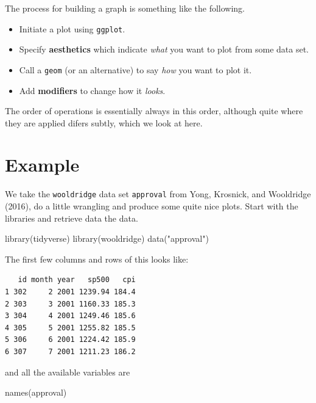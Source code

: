 \documentclass[
  letterpaper,
]{book}
\newenvironment{Shaded}{\begin{snugshade}}{\end{snugshade}}
\newcommand{\FunctionTok}[1]{\textcolor[rgb]{0.28,0.35,0.67}{#1}}
\newcommand{\NormalTok}[1]{\textcolor[rgb]{0.00,0.23,0.31}{#1}}
\newcommand{\StringTok}[1]{\textcolor[rgb]{0.13,0.47,0.30}{#1}}
\providecommand{\tightlist}{%
  \setlength{\itemsep}{0pt}\setlength{\parskip}{0pt}}\usepackage{longtable,booktabs,array}
\begin{document}
The process for building a graph is something like the following.

\begin{itemize}
\tightlist
\item
  Initiate a plot using \texttt{ggplot}.
\item
  Specify \textbf{aesthetics} which indicate \emph{what} you want to
  plot from some data set.
\item
  Call a \texttt{geom} (or an alternative) to say \emph{how} you want to
  plot it.
\item
  Add \textbf{modifiers} to change how it \emph{looks}.
\end{itemize}

The order of operations is essentially always in this order, although
quite where they are applied difers subtly, which we look at here.

\hypertarget{example}{%
\section{Example}\label{example}}

We take the \texttt{wooldridge} data set \texttt{approval} from Yong,
Krosnick, and Wooldridge (2016), do a little wrangling and produce some
quite nice plots. Start with the libraries and retrieve data the data.

\begin{Shaded}
\begin{Highlighting}[]
\FunctionTok{library}\NormalTok{(tidyverse)}
\FunctionTok{library}\NormalTok{(wooldridge)}
\FunctionTok{data}\NormalTok{(}\StringTok{"approval"}\NormalTok{)}
\end{Highlighting}
\end{Shaded}

The first few columns and rows of this looks like:

\begin{verbatim}
   id month year   sp500   cpi
1 302     2 2001 1239.94 184.4
2 303     3 2001 1160.33 185.3
3 304     4 2001 1249.46 185.6
4 305     5 2001 1255.82 185.5
5 306     6 2001 1224.42 185.9
6 307     7 2001 1211.23 186.2
\end{verbatim}

and all the available variables are

\begin{Shaded}
\begin{Highlighting}[]
\FunctionTok{names}\NormalTok{(approval)}
\end{Highlighting}
\end{Shaded}
\end{document}
